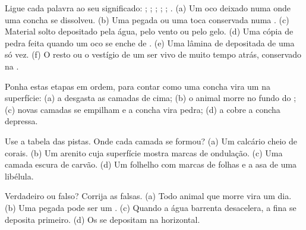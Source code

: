 \begin{exercise}[$\star$]\label{exo:g7:sediments-and-fossils:1}
Ligue cada palavra ao seu significado: ; ; ; ;
; . (a) Um oco deixado numa  onde uma concha se
dissolveu. (b) Uma pegada ou uma toca conservada numa . (c) Material
solto depositado pela água, pelo vento ou pelo gelo. (d) Uma cópia de
pedra feita quando um oco se enche de . (e) Uma lâmina de
 depositada de uma só vez. (f) O resto ou o vestígio de um ser
vivo de muito tempo atrás, conservado na .
\end{exercise}

\begin{exercise}[$\star$]\label{exo:g7:sediments-and-fossils:2}
Ponha estas etapas em ordem, para contar como uma concha vira um 
na superfície: (a) a  desgasta as camadas de cima; (b) o animal
morre no fundo do ; (c) novas camadas se empilham e a concha vira
pedra; (d) a  cobre a concha depressa.
\end{exercise}

\begin{exercise}[$\star$]\label{exo:g7:sediments-and-fossils:3}
Use a tabela das pistas. Onde cada camada se formou? (a) Um calcário
cheio de corais. (b) Um arenito cuja superfície mostra marcas de
ondulação. (c) Uma camada escura de carvão. (d) Um folhelho com marcas de
folhas e a asa de uma libélula.
\end{exercise}

\begin{exercise}[$\star$]\label{exo:g7:sediments-and-fossils:4}
Verdadeiro ou falso? Corrija as falsas. (a) Todo animal que morre vira
 um dia. (b) Uma pegada pode ser um . (c) Quando a água
barrenta desacelera, a  fina se deposita primeiro. (d) Os 
se depositam na horizontal.
\end{exercise}

